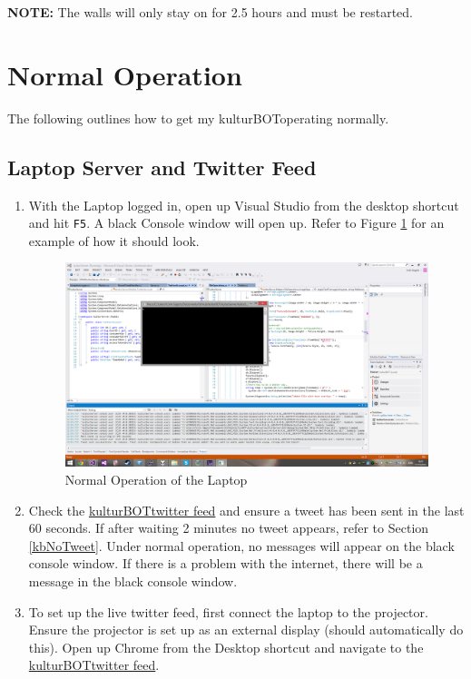 \documentclass[]{article}
\newcommand{\kb}{kulturBOT}
\newcommand{\kbspace}{\kb \space}
\newcommand{\mykb}{my \kb}
\newcommand{\mykbspace}{\mykb \space}
\begin{document}
\textbf{NOTE: } The walls will only stay on for 2.5 hours and must be restarted.

\section{Normal Operation}
The following outlines how to get \mykbspace operating normally.

\subsection{Laptop Server and Twitter Feed}
\begin{enumerate}
	\item With the Laptop logged in, open up Visual Studio from the desktop shortcut and hit \texttt{F5}. A black Console window will open up. Refer to Figure \ref{normalVS} for an example of how it should look.
	
	\begin{figure}[h!]
		\centering
	    \includegraphics[width=1\textwidth]{img/normalVSlook.png}
	    \caption{Normal Operation of the Laptop}
	    \label{normalVS}
	\end{figure}
	
	\item Check the \href{https://twitter.com/kulturBOT}{\kbspace twitter feed} and ensure a tweet has been sent in the last 60 seconds. If after waiting 2 minutes no tweet appears, refer to Section \ref{kbNoTweet}. Under normal operation, no messages will appear on the black console window. If there is a problem with the internet, there will be a message in the black console window.
	
	\item To set up the live twitter feed, first connect the laptop to the projector. Ensure the projector is set up as an external display (should automatically do this). Open up Chrome from the Desktop shortcut and navigate to the \href{https://twitter.com/kulturBOT}{\kbspace twitter feed}.
	

\end{enumerate}
\end{document}
